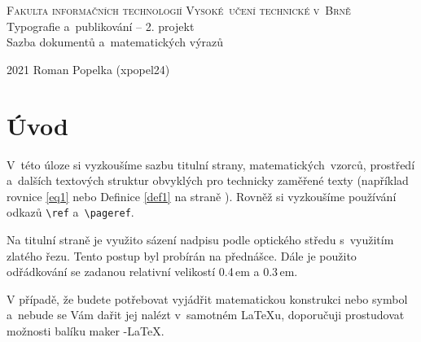 \documentclass[11pt,twocolumn]{article}
\theoremstyle{plain}
\begin{document}
    \begin{titlepage}
        \begin{center}
            \Huge
                \textsc{Fakulta informačních technologií
                Vysoké~učení technické v~Brně}\\
            \LARGE
                Typografie a~publikování -- 2. projekt\\
                Sazba dokumentů a~matematických výrazů \\
        \end{center}
        {\Large 2021 \hfill Roman Popelka (xpopel24)}
    \end{titlepage}

\section*{Úvod}
\label{page1}
V~této úloze si vyzkoušíme sazbu titulní strany, mat\-e\-matic\-kých\ vzorců, prostředí a~dalších textových struktur obvyklých pro technicky zaměřené texty (například rovnice \eqref{eq1} nebo Definice \ref{def1} na straně \pageref{page1}). Rovněž si vyzkoušíme používání odkazů \texttt{\textbackslash ref} a~\texttt{\textbackslash pageref}.

Na titulní straně je využito sázení nadpisu podle optického středu s~využitím zlatého řezu. Tento postup byl probírán na přednášce. Dále je použito odřádkování se zadanou relativní velikostí 0.4\,em a 0.3\,em.

V případě, že budete potřebovat vyjádřit matematickou konstrukci nebo symbol a~nebude se Vám dařit jej nalézt v~samotném \LaTeX u, doporučuji prostudovat možnosti balíku maker \AmS-\LaTeX.
\end{document}
